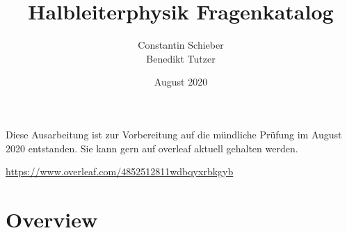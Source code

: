 \documentclass{article}
\title{Halbleiterphysik Fragenkatalog}
\author{Constantin Schieber\\Benedikt Tutzer}
\date{August 2020}
\begin{document}
\maketitle
\vfill
Diese Ausarbeitung ist zur Vorbereitung auf die m\"undliche Pr\"ufung im August 2020 entstanden. Sie kann gern auf overleaf aktuell gehalten werden.\\

\begin{center}\href{Overleaf public link}{https://www.overleaf.com/4852512811wdbqyxrbkgyb}\end{center}

\newpage
\tableofcontents
\newpage

\section*{Overview}
\end{document}
